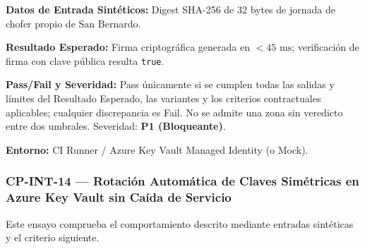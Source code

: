 \par\noindent\textbf{Datos de Entrada Sintéticos:} Digest SHA-256 de 32 bytes de jornada de chofer propio de San Bernardo.\par
\par\noindent\textbf{Resultado Esperado:} Firma criptográfica generada en \(< 45\text{ ms}\); verificación de firma con clave pública resulta \texttt{t\allowbreak{}r\allowbreak{}u\allowbreak{}e\allowbreak{}}.\par
\par\noindent\textbf{Pass/Fail y Severidad:} Pass únicamente si se cumplen todas las salidas y límites del Resultado Esperado, las variantes y los criterios contractuales aplicables; cualquier discrepancia es Fail. No se admite una zona sin veredicto entre dos umbrales. Severidad: \textbf{P1 (Bloqueante)}.\par
\par\noindent\textbf{Entorno:} CI Runner / Azure Key Vault Managed Identity (o Mock).\par






\subsubsection*{CP-INT-14 — Rotación Automática de Claves Simétricas en Azure Key Vault sin Caída de Servicio}\label{sec:9-cp-int-14}
Este ensayo comprueba el comportamiento descrito mediante entradas sintéticas y el criterio siguiente.

